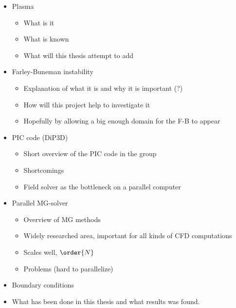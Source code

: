 
	\begin{itemize}
		\item Plasma
			\begin{itemize}
				\item What is it
				\item What is known
				\item What will this thesis attempt to add
			\end{itemize}
		\item Farley-Buneman instability
			\begin{itemize}
				\item Explanation of what it is and why it is important (?)
				\item How will this project help to investigate it
				\item Hopefully by allowing a big enough domain for the F-B to appear
			\end{itemize}
		\item PIC code (DiP3D)
			\begin{itemize}
				\item Short overview of the PIC code in the group
				\item Shortcomings
				\item Field solver as the bottleneck on a parallel computer
			\end{itemize}
		\item Parallel MG-solver
			\begin{itemize}
				\item Overview of MG methods
				\item Widely researched area, important for all kinds of CFD computations
				\item Scales well, \(\order{N}\)
				\item Problems (hard to parallelize)
			\end{itemize}
		\item Boundary conditions
		\item What has been done in this thesis and what results was found.
	\end{itemize}